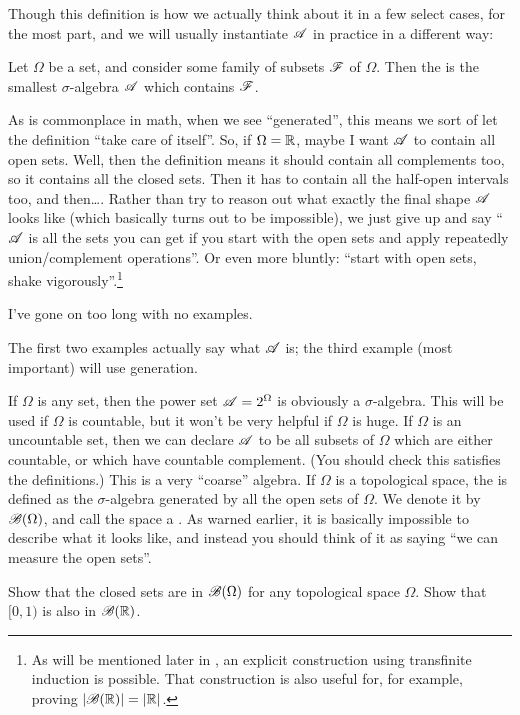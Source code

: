 Though this definition is how we actually think about it in a few select cases,
for the most part, and we will usually instantiate $\mathscr A$ in practice
in a different way:
\begin{definition}
	Let $\Omega$ be a set, and consider some family of subsets $\mathscr F$ of $\Omega$.
	Then the 
	is the smallest $\sigma$-algebra $\mathscr A$ which contains $\mathscr F$.
\end{definition}
As is commonplace in math, when we see ``generated'',
this means we sort of let the definition ``take care of itself''.
So, if $\Omega = \mathbb R$, maybe I want $\mathscr A$ to contain all open sets.
Well, then the definition means it should contain all complements too,
so it contains all the closed sets.
Then it has to contain all the half-open intervals too, and then\dots.
Rather than try to reason out what exactly the final shape $\mathscr A$ looks like
(which basically turns out to be impossible),
we just give up and say ``$\mathscr A$ is all the sets you can get if you start
with the open sets and apply repeatedly union/complement operations''.
Or even more bluntly: ``start with open sets, shake vigorously''.\footnote{As
	will be mentioned later in ,
	an explicit construction using transfinite induction is possible.
	That construction is also useful for, for example, proving $|\mathscr B(\mathbb R)| = |\mathbb R|$.}

I've gone on too long with no examples.
\begin{example}
	The first two examples actually say what $\mathscr A$ is;
	the third example (most important) will use generation.
	\begin{enumerate}[(a)]
		\ii If $\Omega$ is any set,
		then the power set $\mathscr A = 2^{\Omega}$ is obviously a $\sigma$-algebra.
		This will be used if $\Omega$ is countable,
		but it won't be very helpful if $\Omega$ is huge.
		\ii If $\Omega$ is an uncountable set,
		then we can declare $\mathscr A$ to be all subsets of $\Omega$
		which are either countable,
		or which have countable complement.
		(You should check this satisfies the definitions.)
		This is a very ``coarse'' algebra.
		\ii If $\Omega$ is a topological space,
		the 
		is defined as the $\sigma$-algebra generated by all the open sets of $\Omega$.
		We denote it by $\mathscr B(\Omega)$,
		and call the space a .
		As warned earlier, it is basically impossible to describe
		what it looks like,
		and instead you should think of it as saying
		``we can measure the open sets''.
	\end{enumerate}
\end{example}
\begin{ques}
	Show that the closed sets are in $\mathscr B(\Omega)$ for
	any topological space $\Omega$.
	Show that $[0,1)$ %
	is also in $\mathscr B(\mathbb R)$.
\end{ques}

